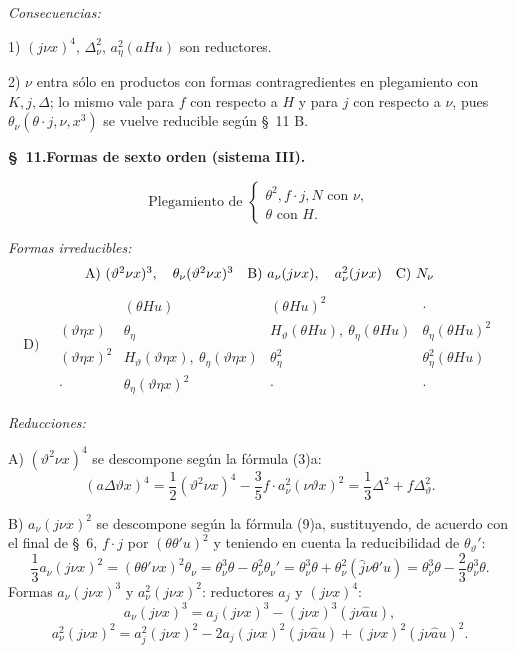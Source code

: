 \documentclass[11pt]{article}
\newcommand{\A}{\Delta}
\begin{document}
\noindent\emph{Consecuencias:}

1) $(j\nu x)^4$, $\A_\nu^2$, $a_\eta^2(aHu)$ son reductores.

2) $\nu$ entra sólo en productos con formas contragredientes en plegamiento con $K,j,\A$; lo mismo vale para $f$ con respecto a $H$ y para $j$ con respecto a $\nu$, pues $\theta_\nu(\theta\cdot j,\nu,x^3)$ se vuelve reducible según \S\ 11 B.

\begin{center}
\textbf{\S\ 11.\quad Formas de sexto orden (sistema III).}
\end{center}
\[
\text{Plegamiento de }\left\{\begin{array}{l}
\theta^2,
 f\cdot j,
 N \text{ con }\nu,\\
\theta\text{ con }H.
\end{array}\right.
\]

\noindent\emph{Formas irreducibles:}
\[
\begin{array}{c@{\quad}c@{\quad}c}
\text{A)}\ (\vartheta^2\nu x)^3,\quad \theta_\nu(\vartheta^2\nu x)^3
&
\text{B)}\ a_\nu(j\nu x),\quad a_\nu^2(j\nu x)
&
\text{C)}\ N_\nu
\end{array}
\]
\[
\text{D)}\quad
\begin{array}{c|c|c|c}
 & (\theta Hu)&(\theta Hu)^2&\cdot\\
(\vartheta\eta x)&\theta_\eta&H_\vartheta(\theta Hu),\ \theta_\eta(\theta Hu)&\theta_\eta(\theta Hu)^2\\
(\vartheta\eta x)^2&H_\vartheta(\vartheta\eta x),\ \theta_\eta(\vartheta\eta x)&\theta_\eta^2&\theta_\eta^2(\theta Hu)\\
\cdot&\theta_\eta(\vartheta\eta x)^2&\cdot&\cdot
\end{array}
\]

\noindent\emph{Reducciones:}

\noindent A) $(\vartheta^2\nu x)^4$ se descompone según la fórmula (3)a:
\[
(a\A\vartheta x)^4=\frac12(\vartheta^2\nu x)^4-\frac35 f\cdot a_\nu^2(\nu\vartheta x)^2
=\frac13\A^2+f\A_\vartheta^2.
\]

\noindent B) $a_\nu(j\nu x)^2$ se descompone según la fórmula (9)a, sustituyendo, de acuerdo con el final de \S\ 6, $f\cdot j$ por $(\theta\theta'u)^2$ y teniendo en cuenta la reducibilidad de $\theta_\vartheta'$:
\[
\frac13a_\nu(j\nu x)^2=(\theta\theta'\nu x)^2\theta_\nu
=\theta_\nu^3\theta-\theta_\nu^2\theta_\nu'
=\theta_\nu^3\theta+\theta_\nu^2(\widehat{j}\nu\theta'u)
=\theta_\nu^3\theta-\frac23\theta_\nu^3\theta.
\]
Formas $a_\nu(j\nu x)^3$ y $a_\nu^2(j\nu x)^2$: reductores $a_j$ y $(j\nu x)^4$:
\[
a_\nu(j\nu x)^3=a_j(j\nu x)^3-(j\nu x)^3(j\nu\widehat{a}u),
\]
\[
a_\nu^2(j\nu x)^2=a_j^2(j\nu x)^2-2a_j(j\nu x)^2(j\nu\widehat{a}u)+(j\nu x)^2(j\nu\widehat{a}u)^2.
\]
\end{document}
